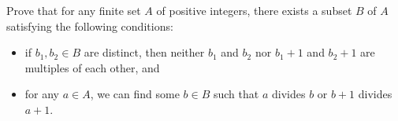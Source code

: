 Prove that for any finite set $A$ of positive integers, there exists a subset $B$ of $A$ satisfying the following conditions:
\begin{itemize}
	\item if $b_1,b_2\in B$ are distinct, then neither $b_1$ and $b_2$ nor $b_1+1$ and $b_2+1$ are multiples of each other, and
	\item for any $a\in A$, we can find some $b\in B$ such that $a$ divides $b$ or $b+1$ divides $a+1$.
\end{itemize}
